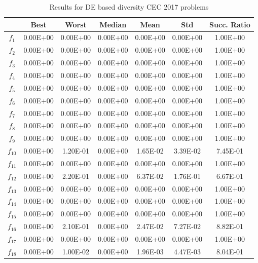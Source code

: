 \begin{table}[t]
\begin{scriptsize}
\centering
\caption{Results for DE based diversity CEC 2017 problems}
\label{tab:Results_CEC2017}
\begin{tabular}{|c|c|c|c|c|c|c|}
\hline
 & \textbf{Best} & \textbf{Worst} & \textbf{Median} & \textbf{Mean} & \textbf{Std} & \textbf{Succ. Ratio} \\ \hline
$f_1$ & 0.00E+00 & 0.00E+00 & 0.00E+00 & 0.00E+00 & 0.00E+00 & 1.00E+00 \\ \hline
$f_2$ & 0.00E+00 & 0.00E+00 & 0.00E+00 & 0.00E+00 & 0.00E+00 & 1.00E+00 \\ \hline
$f_3$ & 0.00E+00 & 0.00E+00 & 0.00E+00 & 0.00E+00 & 0.00E+00 & 1.00E+00 \\ \hline
$f_4$ & 0.00E+00 & 0.00E+00 & 0.00E+00 & 0.00E+00 & 0.00E+00 & 1.00E+00 \\ \hline
$f_5$ & 0.00E+00 & 0.00E+00 & 0.00E+00 & 0.00E+00 & 0.00E+00 & 1.00E+00 \\ \hline
$f_6$ & 0.00E+00 & 0.00E+00 & 0.00E+00 & 0.00E+00 & 0.00E+00 & 1.00E+00 \\ \hline
$f_7$ & 0.00E+00 & 0.00E+00 & 0.00E+00 & 0.00E+00 & 0.00E+00 & 1.00E+00 \\ \hline
$f_8$ & 0.00E+00 & 0.00E+00 & 0.00E+00 & 0.00E+00 & 0.00E+00 & 1.00E+00 \\ \hline
$f_9$ & 0.00E+00 & 0.00E+00 & 0.00E+00 & 0.00E+00 & 0.00E+00 & 1.00E+00 \\ \hline
$f_{10}$ & 0.00E+00 & 1.20E-01 & 0.00E+00 & 1.65E-02 & 3.39E-02 & 7.45E-01 \\ \hline
$f_{11}$ & 0.00E+00 & 0.00E+00 & 0.00E+00 & 0.00E+00 & 0.00E+00 & 1.00E+00 \\ \hline
$f_{12}$ & 0.00E+00 & 2.20E-01 & 0.00E+00 & 6.37E-02 & 1.76E-01 & 6.67E-01 \\ \hline
$f_{13}$ & 0.00E+00 & 0.00E+00 & 0.00E+00 & 0.00E+00 & 0.00E+00 & 1.00E+00 \\ \hline
$f_{14}$ & 0.00E+00 & 0.00E+00 & 0.00E+00 & 0.00E+00 & 0.00E+00 & 1.00E+00 \\ \hline
$f_{15}$ & 0.00E+00 & 0.00E+00 & 0.00E+00 & 0.00E+00 & 0.00E+00 & 1.00E+00 \\ \hline
$f_{16}$ & 0.00E+00 & 2.10E-01 & 0.00E+00 & 2.47E-02 & 7.27E-02 & 8.82E-01 \\ \hline
$f_{17}$ & 0.00E+00 & 0.00E+00 & 0.00E+00 & 0.00E+00 & 0.00E+00 & 1.00E+00 \\ \hline
$f_{18}$ & 0.00E+00 & 1.00E-02 & 0.00E+00 & 1.96E-03 & 4.47E-03 & 8.04E-01 \\ \hline

\end{tabular}
\end{scriptsize}
\end{table}
